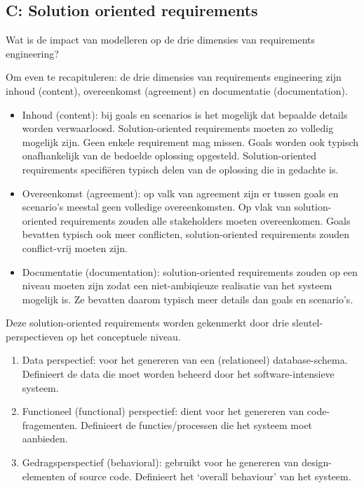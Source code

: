 \documentclass{article}
\begin{document}
\subsection*{C: Solution oriented requirements}

\begin{quest} Wat is de impact van modelleren op de drie dimensies van requirements engineering?
\end{quest}
Om even te recapituleren: de drie dimensies van requirements engineering zijn inhoud (content), overeenkomst (agreement) en documentatie (documentation).

\begin{itemize}
\item Inhoud (content): bij goals en scenarios is het mogelijk dat bepaalde details worden verwaarloosd. Solution-oriented requirements moeten zo volledig mogelijk zijn. Geen enkele requirement mag missen. Goals worden ook typisch onafhankelijk van de bedoelde oplossing opgesteld. Solution-oriented requirements specifi\"eren typisch delen van de oplossing die in gedachte is.
\item Overeenkomst (agreement): op valk van agreement zijn er tussen goals en scenario's meestal geen volledige overeenkomsten. Op vlak  van solution-oriented requirements zouden alle stakeholders moeten overeenkomen. Goals bevatten typisch ook meer conflicten, solution-oriented requirements zouden conflict-vrij moeten zijn.
\item Documentatie (documentation): solution-oriented requirements zouden op een niveau moeten zijn zodat een niet-ambiqieuze realisatie van het systeem mogelijk is. Ze bevatten daarom typisch meer details dan goals en scenario's.
\end{itemize}
Deze solution-oriented requirements worden gekenmerkt door drie sleutel-perspectieven op het conceptuele niveau.
\begin{enumerate}
\item Data perspectief: voor het genereren van een (relationeel) database-schema. Definieert de data die moet worden beheerd door het software-intensieve systeem.
\item Functioneel (functional) perspectief: dient voor het genereren van code-fragementen. Definieert de functies/processen die het systeem moet aanbieden.
\item Gedragsperspectief (behavioral): gebruikt voor he genereren van design-elementen of source code. Definieert het `overall behaviour' van het systeem. 
\end{enumerate}
\end{document}

